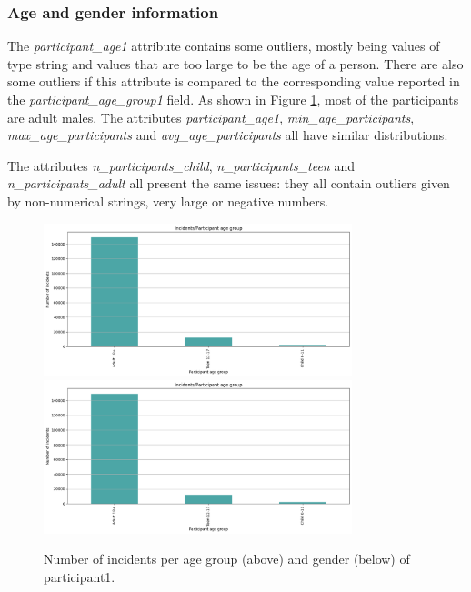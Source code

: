 \documentclass[11pt,a4paper]{report}
\begin{document}
\subsubsection{Age and gender information}

The \textit{participant\_age1} attribute contains some outliers, mostly being values of type string and values that are too large to be the age of a person.
There are also some outliers if this attribute is compared to the corresponding value reported in the \textit{participant\_age\_group1} field.
As shown in Figure \ref{incidents_per_agegender}, most of the participants are adult males.
The attributes \textit{participant\_age1}, \textit{min\_age\_participants}, \textit{max\_age\_participants} and \textit{avg\_age\_participants} all have similar distributions.

The attributes \textit{n\_participants\_child}, \textit{n\_participants\_teen} and \textit{n\_participants\_adult} all present the same issues: they all contain outliers given by non-numerical strings, very large or negative numbers.

\begin{figure}[H]
	\includegraphics[width=0.8\textwidth]{incidents_per_agegroup}
	\centering
	\includegraphics[width=0.8\textwidth]{incidents_per_gender}
	\caption{Number of incidents per age group (above) and gender (below) of participant1.}
	\label{incidents_per_agegender}
\end{figure}
\end{document}
